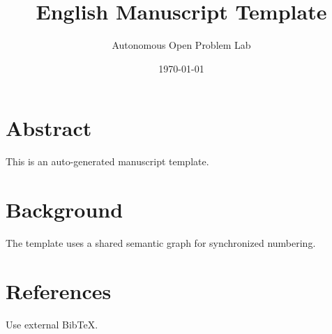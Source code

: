 \documentclass[11pt]{article}
\title{English Manuscript Template}
\author{Autonomous Open Problem Lab}
\date{\today}
\begin{document}
\maketitle
\section*{Abstract}
This is an auto-generated manuscript template.
\section{Background}
The template uses a shared semantic graph for synchronized numbering.
\section{References}
Use external BibTeX.
\end{document}
